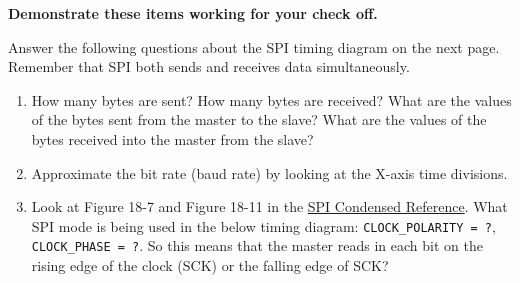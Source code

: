 \documentclass[11pt]{article}
\begin{document}
\textbf{Demonstrate these items working for your check off.}


Answer the following questions about the SPI timing diagram on the next page. Remember that SPI both sends and receives data simultaneously.
%
\begin{enumerate}
    \item How many bytes are sent? How many bytes are received? What are the values of the bytes sent from the master to the slave? What are the values of the bytes received into the master from the slave?
    \item Approximate the bit rate (baud rate) by looking at the X-axis time divisions.
        \item Look at Figure 18-7 and Figure 18-11 in the \href{http://coecsl.ece.illinois.edu/se423/SPICondensed_TechRef.pdf}{SPI Condensed Reference}. What SPI mode is being used in the below timing diagram: \texttt{CLOCK_POLARITY = ?}, \texttt{CLOCK_PHASE = ?}. So this means that the master reads in each bit on the rising edge of the clock (SCK) or the falling edge of SCK?
\end{enumerate}
%
\MakeFooter
%
\end{document}
